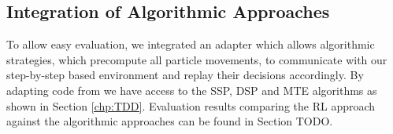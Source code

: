 \subsection{Integration of Algorithmic Approaches} \label{sec:AlgorithmIntegration}
To allow easy evaluation, we integrated an adapter which allows algorithmic strategies, which precompute all particle movements, to communicate with our step-by-step based environment and replay their decisions accordingly. By adapting code from \cite{becker2020} we have access to the SSP, DSP and MTE algorithms as shown in Section \ref{chp:TDD}. Evaluation results comparing the RL approach against the algorithmic approaches can be found in Section TODO.



